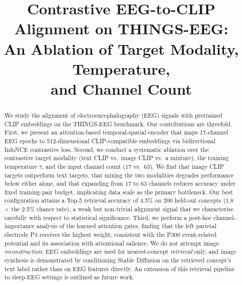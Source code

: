 \documentclass[conference]{IEEEtran}
\begin{document}
\title{Contrastive EEG-to-CLIP Alignment on THINGS-EEG:\\
An Ablation of Target Modality, Temperature,\\
and Channel Count}

\author{
}

\maketitle

\begin{abstract}
We study the alignment of electroencephalography
(EEG) signals with pretrained CLIP embeddings
on the THINGS-EEG benchmark. Our contributions
are threefold. First, we present an
attention-based temporal-spatial encoder that
maps 17-channel EEG epochs to 512-dimensional
CLIP-compatible embeddings via bidirectional
InfoNCE contrastive loss. Second, we conduct
a systematic ablation over the contrastive
target modality (text CLIP vs.\ image CLIP
vs.\ a mixture), the training temperature
$\tau$, and the input channel count
(17 vs.\ 63). We find that image CLIP targets
outperform text targets, that mixing the two
modalities degrades performance below either
alone, and that expanding from 17 to 63
channels reduces accuracy under fixed
training-pair budget, implicating data scale
as the primary bottleneck. Our best
configuration attains a Top-5 retrieval
accuracy of 4.5\% on 200 held-out concepts
(1.8$\times$ the 2.5\% chance rate), a weak
but non-trivial alignment signal that we
characterise carefully with respect to
statistical significance. Third, we perform
a post-hoc channel-importance analysis of
the learned attention gates, finding that
the left parietal electrode P3 receives
the highest weight, consistent with the
P300 event-related potential and its
association with attentional salience.
We do not attempt image \emph{reconstruction}:
EEG embeddings are used for nearest-concept
\emph{retrieval} only, and image synthesis is
demonstrated by conditioning Stable Diffusion
on the retrieved concept's text label rather
than on EEG features directly. An extension
of this retrieval pipeline to sleep-EEG
settings is outlined as future work.
\end{abstract}
\end{document}
